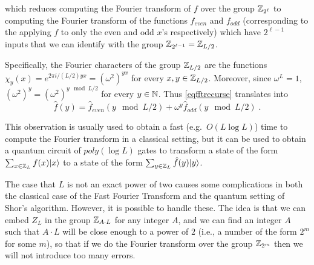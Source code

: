 which reduces computing the Fourier transform of \(f\) over the group
\({\mathbb{Z}}_{2^\ell}\) to computing the Fourier transform of the functions
\(f_{even}\) and \(f_{odd}\) (corresponding to the applying \(f\) to
only the even and odd \(x\)'s respectively) which have \(2^{\ell-1}\)
inputs that we can identify with the group \({\mathbb{Z}}_{2^{\ell-1}}={\mathbb{Z}}_{L/2}\).

Specifically, the Fourier characters of the group \({\mathbb{Z}}_{L/2}\) are the
functions \(\chi_y(x) = e^{2\pi i/(L/2) yx} = (\omega^2)^{yx}\) for
every \(x,y \in {\mathbb{Z}}_{L/2}\). Moreover, since \(\omega^L = 1\),
\((\omega^2)^y = (\omega^2)^{y \mod L/2}\) for every \(y\in {\mathbb{N}}\). Thus
\eqref{eqfftrecurse} translates into
\[\hat{f}(y) = \hat{f}_{even}(y \mod L/2) + \omega^y \hat{f}_{odd}(y \mod L/2) \;.
\]

This observation is usually used to obtain a fast (e.g.~\(O(L \log L)\))
time to compute the Fourier transform in a classical setting, but it can
be used to obtain a quantum circuit of \(poly(\log L)\) gates to
transform a state of the form \(\sum_{x\in {\mathbb{Z}}_L} f(x)|x\rangle\) to a
state of the form \(\sum_{y\in {\mathbb{Z}}_L} \hat{f}(y)|y \rangle\).

The case that \(L\) is not an exact power of two causes some
complications in both the classical case of the Fast Fourier Transform
and the quantum setting of Shor's algorithm. However, it is possible to
handle these. The idea is that we can embed \(Z_L\) in the group
\({\mathbb{Z}}_{A\cdot L}\) for any integer \(A\), and we can find an integer
\(A\) such that \(A\cdot L\) will be close enough to a power of \(2\)
(i.e., a number of the form \(2^m\) for some \(m\)), so that if we do
the Fourier transform over the group \({\mathbb{Z}}_{2^m}\) then we will not
introduce too many errors.


